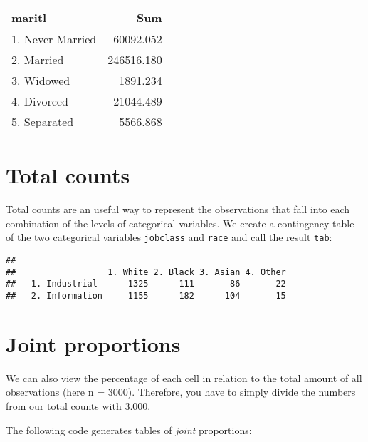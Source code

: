 \documentclass[
]{book}
\newenvironment{Shaded}{\begin{snugshade}}{\end{snugshade}}
\newcommand{\KeywordTok}[1]{\textcolor[rgb]{0.13,0.29,0.53}{\textbf{#1}}}
\newcommand{\NormalTok}[1]{#1}
\newcommand{\OperatorTok}[1]{\textcolor[rgb]{0.81,0.36,0.00}{\textbf{#1}}}
\newcommand{\StringTok}[1]{\textcolor[rgb]{0.31,0.60,0.02}{#1}}
\begin{document}
\captionsetup[table]{labelformat=empty,skip=1pt}
\begin{longtable}{lr}
\toprule
maritl & Sum \\ 
\midrule
1. Never Married & 60092.052 \\ 
2. Married & 246516.180 \\ 
3. Widowed & 1891.234 \\ 
4. Divorced & 21044.489 \\ 
5. Separated & 5566.868 \\ 
\bottomrule
\end{longtable}

\hypertarget{total-counts}{%
\section{Total counts}\label{total-counts}}

Total counts are an useful way to represent the observations that fall into each combination of the levels of categorical variables. We create a contingency table of the two categorical variables \texttt{jobclass} and \texttt{race} and call the result \texttt{tab}:

\begin{Shaded}
\end{Shaded}

\begin{verbatim}
##                 
##                  1. White 2. Black 3. Asian 4. Other
##   1. Industrial      1325      111       86       22
##   2. Information     1155      182      104       15
\end{verbatim}

\hypertarget{joint-proportions}{%
\section{Joint proportions}\label{joint-proportions}}

We can also view the percentage of each cell in relation to the total amount of all observations (here n = 3000). Therefore, you have to simply divide the numbers from our total counts with 3.000.

The following code generates tables of \emph{joint} proportions:
\end{document}
